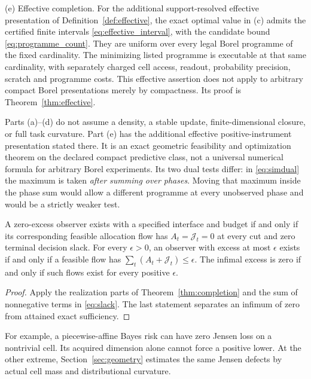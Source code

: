 \begin{theorem}
\medskip\noindent\textup{(e) Effective completion.} For the additional support-resolved effective presentation of Definition~\ref{def:effective}, the exact optimal value in \textup{(c)} admits the certified finite intervals \eqref{eq:effective_interval}, with the candidate bound \eqref{eq:programme_count}. They are uniform over every legal Borel programme of the fixed cardinality. The minimizing listed programme is executable at that same cardinality, with separately charged cell access, readout, probability precision, scratch and programme costs. This effective assertion does not apply to arbitrary compact Borel presentations merely by compactness. Its proof is Theorem~\ref{thm:effective}.
\end{theorem}

Parts (a)--(d) do not assume a density, a stable update, finite-dimensional closure, or full task curvature. Part (e) has the additional effective positive-instrument presentation stated there. It is an exact geometric feasibility and optimization theorem on the declared compact predictive class, not a universal numerical formula for arbitrary Borel experiments. Its two dual tests differ: in \eqref{eq:simdual} the maximum is taken \emph{after summing over phases}. Moving that maximum inside the phase sum would allow a different programme at every unobserved phase and would be a strictly weaker test.

\begin{corollary}\label{cor:zero}
A zero-excess observer exists with a specified interface and budget if and only if its corresponding feasible allocation flow has $A_t=\mathscr J_t=0$ at every cut and zero terminal decision slack. For every $\epsilon>0$, an observer with excess at most $\epsilon$ exists if and only if a feasible flow has $\sum_t(A_t+\mathscr J_t)\le\epsilon$. The infimal excess is zero if and only if such flows exist for every positive $\epsilon$.
\end{corollary}
\begin{proof}
Apply the realization parts of Theorem~\ref{thm:completion} and the sum of nonnegative terms in \eqref{eq:slack}. The last statement separates an infimum of zero from attained exact sufficiency.
\end{proof}
For example, a piecewise-affine Bayes risk can have zero Jensen loss on a nontrivial cell. Its acquired dimension alone cannot force a positive lower. At the other extreme, Section~\ref{sec:geometry} estimates the same Jensen defects by actual cell mass and distributional curvature.

